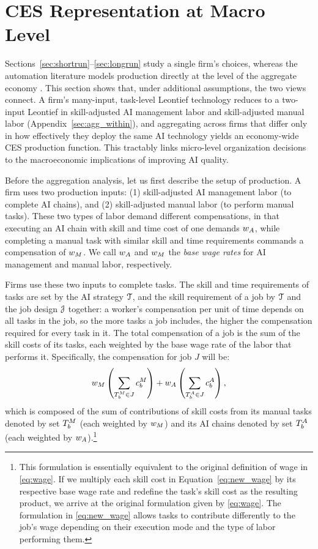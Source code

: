 \section{CES Representation at Macro Level}
\label{sec:aggregation}

Sections~\ref{sec:shortrun}--\ref{sec:longrun} study a single firm's choices, whereas the automation literature models production directly at the level of the aggregate economy \citep{acemoglu2018, acemoglu2022tasks, acemoglu2025simple}.
This section shows that, under additional assumptions, the two views connect.
A firm's many-input, task-level Leontief technology reduces to a two-input Leontief in skill-adjusted AI management labor and skill-adjusted manual labor (Appendix~\ref{sec:agg_within}), and aggregating across firms that differ only in how effectively they deploy the same AI technology yields an economy-wide CES production function.
This tractably links micro-level organization decisions to the macroeconomic implications of improving AI quality.

Before the aggregation analysis, let us first describe the setup of production.
A firm uses two production inputs: (1) skill-adjusted AI management labor (to complete AI chains), and (2) skill-adjusted manual labor (to perform manual tasks).
These two types of labor demand different compensations, in that executing an AI chain with skill and time cost of one demands $w_{A}$, while completing a manual task with similar skill and time requirements commands a compensation of $w_{M}$.
We call $w_{A}$ and $w_{M}$ the \emph{base wage rates} for AI management and manual labor, respectively.

Firms use these two inputs to complete tasks.
The skill and time requirements of tasks are set by the AI strategy $\mathcal{T}$, and the skill requirement of a job by $\mathcal{T}$ and the job design $\mathcal{J}$ together: a worker's compensation per unit of time depends on all tasks in the job, so the more tasks a job includes, the higher the compensation required for every task in it.
The total compensation of a job is the sum of the skill costs of its tasks, each weighted by the base wage rate of the labor that performs it.
Specifically, the compensation for job $J$ will be:
\begin{equation}
w_{M} \left(\sum_{T_b^{M} \in J} c^{M}_{b}\right) + w_{A} \left(\sum_{T_b^{A} \in J} c^{A}_{b}\right),\label{eq:new_wage}
\end{equation}
which is composed of the sum of contributions of skill costs from its manual tasks denoted by set $T_b^{M}$ (each weighted by $w_{M}$) and its AI chains denoted by set $T_b^{A}$ (each weighted by $w_{A}$).\footnote{
This formulation is essentially equivalent to the original definition of wage in \eqref{eq:wage}.
If we multiply each skill cost in Equation~\eqref{eq:new_wage} by its respective base wage rate and redefine the task's skill cost as the resulting product, we arrive at the original formulation given by \eqref{eq:wage}.
The formulation in \eqref{eq:new_wage} allows tasks to contribute differently to the job's wage depending on their execution mode and the type of labor performing them.}


